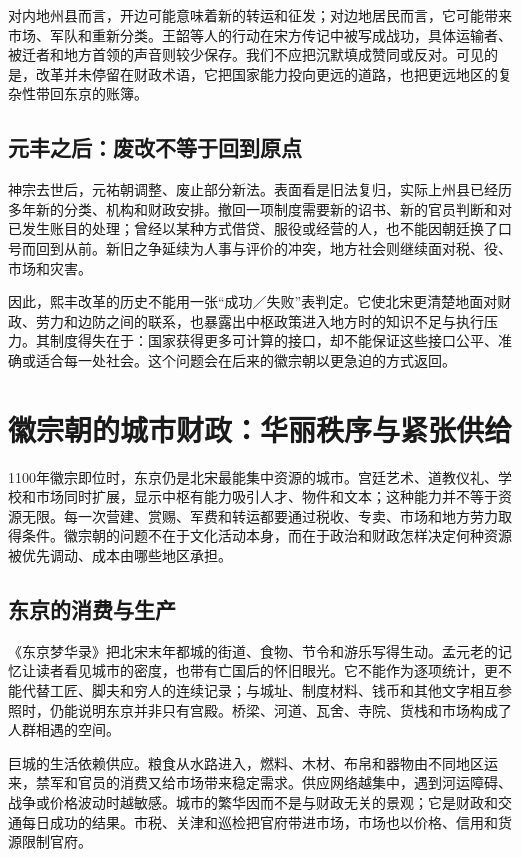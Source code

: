 对内地州县而言，开边可能意味着新的转运和征发；对边地居民而言，它可能带来市场、军队和重新分类。王韶等人的行动在宋方传记中被写成战功，具体运输者、被迁者和地方首领的声音则较少保存。我们不应把沉默填成赞同或反对。可见的是，改革并未停留在财政术语，它把国家能力投向更远的道路，也把更远地区的复杂性带回东京的账簿。

\subsection{元丰之后：废改不等于回到原点}

神宗去世后，元祐朝调整、废止部分新法。表面看是旧法复归，实际上州县已经历多年新的分类、机构和财政安排。撤回一项制度需要新的诏书、新的官员判断和对已发生账目的处理；曾经以某种方式借贷、服役或经营的人，也不能因朝廷换了口号而回到从前。新旧之争延续为人事与评价的冲突，地方社会则继续面对税、役、市场和灾害。

因此，熙丰改革的历史不能用一张“成功／失败”表判定。它使北宋更清楚地面对财政、劳力和边防之间的联系，也暴露出中枢政策进入地方时的知识不足与执行压力。其制度得失在于：国家获得更多可计算的接口，却不能保证这些接口公平、准确或适合每一处社会。这个问题会在后来的徽宗朝以更急迫的方式返回。

\section{徽宗朝的城市财政：华丽秩序与紧张供给}

1100年徽宗即位时，东京仍是北宋最能集中资源的城市。宫廷艺术、道教仪礼、学校和市场同时扩展，显示中枢有能力吸引人才、物件和文本；这种能力并不等于资源无限。每一次营建、赏赐、军费和转运都要通过税收、专卖、市场和地方劳力取得条件。徽宗朝的问题不在于文化活动本身，而在于政治和财政怎样决定何种资源被优先调动、成本由哪些地区承担。

\subsection{东京的消费与生产}

《东京梦华录》把北宋末年都城的街道、食物、节令和游乐写得生动。孟元老的记忆让读者看见城市的密度，也带有亡国后的怀旧眼光。它不能作为逐项统计，更不能代替工匠、脚夫和穷人的连续记录；与城址、制度材料、钱币和其他文字相互参照时，仍能说明东京并非只有宫殿。桥梁、河道、瓦舍、寺院、货栈和市场构成了人群相遇的空间。

巨城的生活依赖供应。粮食从水路进入，燃料、木材、布帛和器物由不同地区运来，禁军和官员的消费又给市场带来稳定需求。供应网络越集中，遇到河运障碍、战争或价格波动时越敏感。城市的繁华因而不是与财政无关的景观；它是财政和交通每日成功的结果。市税、关津和巡检把官府带进市场，市场也以价格、信用和货源限制官府。

